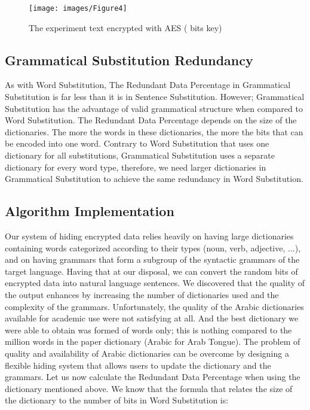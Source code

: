 \documentclass{acm_proc_article-sp}
\begin{document}
\begin{figure}
  \centering
  \texttt{[image: images/Figure4]}
  \caption{The experiment text encrypted with AES ( bits key)}\label{The-experiment-text-encrypted-with-AES}
\end{figure}

\subsection{Grammatical Substitution Redundancy}\label{Grammatical-Substitution-Redundancy}
As with Word Substitution, The Redundant Data Percentage in Grammatical Substitution is far less than it is in Sentence Substitution. However; Grammatical Substitution has the advantage of valid grammatical structure when compared to Word Substitution. The Redundant Data Percentage depends on the size of the dictionaries. The more the words in these dictionaries, the more the bits that can be encoded into one word. Contrary to Word Substitution that uses one dictionary for all substitutions, Grammatical Substitution uses a separate dictionary for every word type, therefore, we need larger dictionaries in Grammatical Substitution to achieve the same redundancy in Word Substitution.

\subsection{Algorithm Implementation}\label{Algorithm-Implementation}
Our system of hiding encrypted data relies heavily on having large dictionaries containing words categorized according to their types (noun, verb, adjective, ...), and on having grammars that form a subgroup of the syntactic grammars of the target language. Having that at our disposal, we can convert the random bits of encrypted data into natural language sentences. We discovered that the quality of the output enhances by increasing the number of dictionaries used and the complexity of the grammars. Unfortunately, the quality of the Arabic dictionaries available for academic use were not satisfying at all. And the best dictionary we were able to obtain was formed of  words only; this is nothing compared to the  million words in the paper dictionary  (Arabic for Arab Tongue). The problem of quality and availability of Arabic dictionaries can be overcome by designing a flexible hiding system that allows users to update the dictionary and the grammars. Let us now calculate the Redundant Data Percentage when using the dictionary mentioned above. We know that the formula that relates the size of the dictionary  to the number of bits  in Word Substitution is:
\end{document}
